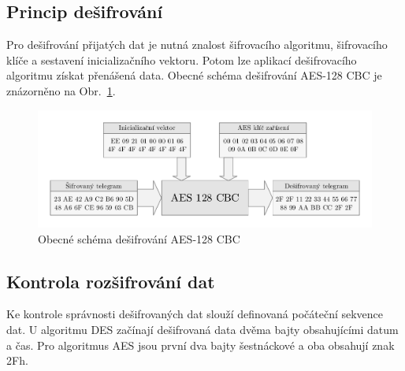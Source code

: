 \subsection{Princip dešifrování}
Pro dešifrování přijatých dat je nutná znalost šifrovacího algoritmu, šifrovacího klíče a sestavení inicializačního vektoru. Potom lze aplikací dešifrovacího algoritmu získat přenášená data. Obecné schéma dešifrování AES-128 CBC je znázorněno na Obr.~\ref{SchemaAESobecne}.
\begin{figure}[!ht]
\vspace{-20pt}
 \begin{center}
    \includegraphics[scale=0.8]{obrazky/wmbus_aes_schema}
  \end{center}
	\vspace{-30pt}
  \caption{Obecné schéma dešifrování AES-128 CBC}
	\label{SchemaAESobecne}
	\vspace{-20pt}
\end{figure}

\subsection{Kontrola rozšifrování dat}
Ke kontrole správnosti dešifrovaných dat slouží definovaná počáteční sekvence dat. U algoritmu DES začínají dešifrovaná data dvěma bajty obsahujícími datum a čas. Pro algoritmus AES jsou první dva bajty šestnáckové a oba obsahují znak 2Fh.

